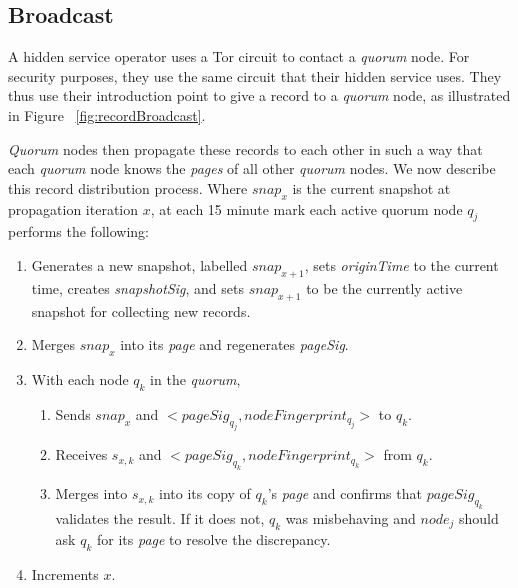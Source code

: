 \subsection{Broadcast}
\label{sec:Broadcast}

A hidden service operator uses a Tor circuit to contact a \emph{quorum} node. For security purposes, they use the same circuit that their hidden service uses. They thus use their introduction point to give a record to a \emph{quorum} node, as illustrated in Figure ~\ref{fig:recordBroadcast}.

\emph{Quorum} nodes then propagate these records to each other in such a way that each \emph{quorum} node knows the \emph{pages} of all other \emph{quorum} nodes. We now describe this record distribution process. Where $ snap_{x} $ is the current snapshot at propagation iteration $ x $, at each 15 minute mark each active quorum node $ q_{j} $ performs the following:

\begin{enumerate}
	\item Generates a new snapshot, labelled $ snap_{x+1} $, sets \emph{originTime} to the current time, creates \emph{snapshotSig}, and sets $ snap_{x+1} $ to be the currently active snapshot for collecting new records.
	\item Merges $ snap_{x} $ into its \emph{page} and regenerates \emph{pageSig}.
	\item With each node $ q_{k} $ in the \emph{quorum}, 
		\begin{enumerate}
			\item Sends $ snap_{x} $ and $ <pageSig_{q_{j}}, nodeFingerprint_{q_{j}}> $ to $ q_{k} $.
			\item Receives $ s_{x, k} $ and $ <pageSig_{q_{k}}, nodeFingerprint_{q_{k}}> $ from $ q_{k} $.
			\item Merges into $ s_{x, k} $ into its copy of $ q_{k} $'s \emph{page} and confirms that $ pageSig_{q_{k}} $ validates the result. If it does not, $ q_{k} $ was misbehaving and $ node_{j} $ should ask $ q_{k} $ for its \emph{page} to resolve the discrepancy.
		\end{enumerate}
	\item Increments $ x $.
	
\end{enumerate}



